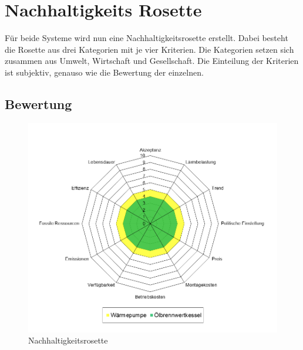 \chapter{Nachhaltigkeits Rosette}
\label{chap:rosette}

Für beide Systeme wird nun eine Nachhaltigkeitsrosette erstellt. Dabei besteht die Rosette aus drei Kategorien mit je vier Kriterien. Die Kategorien setzen sich zusammen aus Umwelt, Wirtschaft und Gesellschaft. Die Einteilung der Kriterien ist subjektiv, genauso wie die Bewertung der einzelnen.



\section{Bewertung}

\begin{figure}[h]
\caption{Nachhaltigkeitsrosette}
\includegraphics[scale=0.5]{bilder/Rosette.png}

\end{figure}

